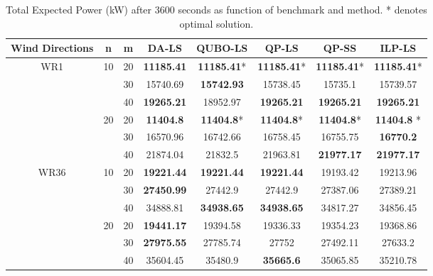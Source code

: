 \documentclass[preprint,12pt]{elsarticle}
\begin{document}
\begin{table}[t!]
	
	\begin{tabular}{| c | c | c | c | c | c | c | c |}
		\toprule
		Wind Directions  & n  & m  & DA-LS  & QUBO-LS  & QP-LS  & QP-SS  & ILP-LS  \\
		\toprule
		\multirow{6}{*}{WR1}  & \multirow{3}{*}{10}       & 20       & \textbf{11185.41} & \textbf{11185.41}* & \textbf{11185.41}* & \textbf{11185.41}* & \textbf{11185.41}* \\
		& & 30   & 15740.69 & \textbf{15742.93}  & 15738.45  & 15735.1  & 15739.57     \\
		& & 40 & \textbf{19265.21} & 18952.97 & \textbf{19265.21}  & \textbf{19265.21} & \textbf{19265.21}                \\
		\cline{2-8}
		&\multirow{3}{*}{20}   & 20       & \textbf{11404.8}  & \textbf{11404.8}*  & \textbf{11404.8}*  & \textbf{11404.8}*  & \textbf{11404.8} *          \\
		&&30   & 16570.96 & 16742.66  & 16758.45  & 16755.75 & \textbf{16770.2 }                 \\
		&&40   & 21874.04 & 21832.5  & 21963.81 & \textbf{21977.17} & \textbf{21977.17}        \\
		\hline
		\multirow{6}{*}{WR36} &  \multirow{3}{*}{10}    & 20       & \textbf{19221.44} & \textbf{19221.44} & \textbf{19221.44} & 19193.42 & 19213.96 \\
		&& 30  & \textbf{27450.99} & 27442.9 & 27442.9 & 27387.06 & 27389.21                     \\
		&&40   & 34888.81 & \textbf{34938.65} & \textbf{34938.65} & 34817.27  & 34856.45          \\
		\cline{2-8}
		&  \multirow{3}{*}{20}   & 20   & \textbf{19441.17}  & 19394.58 & 19336.33 & 19354.23  & 19368.86            \\
		&&30   & \textbf{27975.55} & 27785.74  & 27752 & 27492.11  & 27633.2                      \\
		&&40   & 35604.45 & 35480.9 & \textbf{35665.6}   & 35065.85 & 35210.78 \\
		\bottomrule                   
	\end{tabular}
	
	\vspace{0.5em}
	\caption{Total Expected Power (kW) after 3600 seconds as function of benchmark and method. * denotes optimal solution.}\label{tab:results2}
\end{table}
\end{document}
